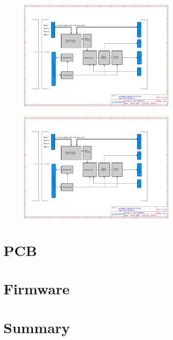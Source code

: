\begin{figure}[htbp]
    \centering
    \includegraphics[page=3, width=0.7\textwidth]{./Schematics/Schematic_LcsNodes-Extension-Combo-1-Board.pdf}
\end{figure}
\FloatBarrier

\begin{figure}[htbp]
    \centering
    \includegraphics[page=4, width=0.7\textwidth]{./Schematics/Schematic_LcsNodes-Extension-Combo-1-Board.pdf}
\end{figure}
\FloatBarrier

\section{PCB}


\section{Firmware}

\section{Summary}
